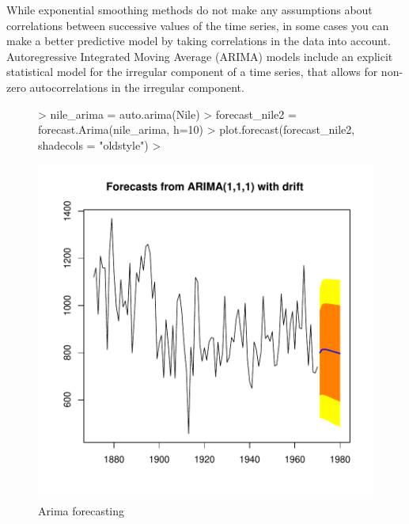 \documentclass[10pt, a4paper]{article} %
\begin{document}
\noindent While exponential smoothing methods do not make any assumptions about correlations between successive values of the time series, in some cases you can make a better predictive model by taking correlations in the data into account. Autoregressive Integrated Moving Average (ARIMA) models include an explicit statistical model for the irregular component of a time series, that allows for non-zero autocorrelations in the irregular component.
\begin{figure}[H]
\centering
\begin{Schunk}
\begin{Sinput}
> nile_arima = auto.arima(Nile)
> forecast_nile2 = forecast.Arima(nile_arima, h=10)
> plot.forecast(forecast_nile2, shadecols = "oldstyle")
> 
\end{Sinput}
\end{Schunk}
\includegraphics{FINAL_VERSION-097}
\caption{Arima forecasting}
\end{figure}
\end{document}
